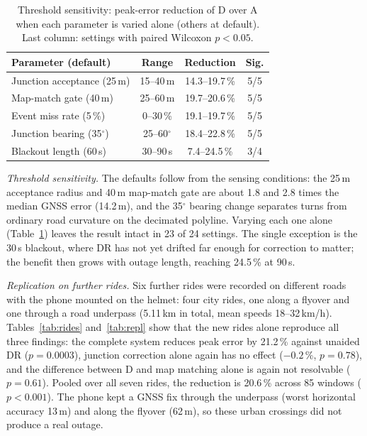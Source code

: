 \documentclass[conference]{IEEEtran}
\begin{document}
\begin{table}[t]
\centering
\caption{Threshold sensitivity: peak-error reduction of D over A when each parameter is varied alone (others at default). Last column: settings with paired Wilcoxon $p{<}0.05$.}
\label{tab:sweep}
\setlength{\tabcolsep}{3pt}
\begin{tabular}{@{}lccc@{}}
\toprule
\textbf{Parameter (default)} & \textbf{Range} & \textbf{Reduction} & \textbf{Sig.}\\
\midrule
Junction acceptance (25\,m) & 15--40\,m & 14.3--19.7\,\% & 5/5\\
Map-match gate (40\,m) & 25--60\,m & 19.7--20.6\,\% & 5/5\\
Event miss rate (5\,\%) & 0--30\,\% & 19.1--19.7\,\% & 5/5\\
Junction bearing (35$^\circ$) & 25--60$^\circ$ & 18.4--22.8\,\% & 5/5\\
Blackout length (60\,s) & 30--90\,s & 7.4--24.5\,\% & 3/4\\
\bottomrule
\end{tabular}
\end{table}

\emph{Threshold sensitivity.} The defaults follow from the sensing conditions: the 25\,m acceptance radius and 40\,m map-match gate are about 1.8 and 2.8 times the median GNSS error (14.2\,m), and the 35$^\circ$ bearing change separates turns from ordinary road curvature on the decimated polyline. Varying each one alone (Table~\ref{tab:sweep}) leaves the result intact in 23 of 24 settings. The single exception is the 30\,s blackout, where DR has not yet drifted far enough for correction to matter; the benefit then grows with outage length, reaching 24.5\,\% at 90\,s.

\emph{Replication on further rides.} Six further rides were recorded on different roads with the phone mounted on the helmet: four city rides, one along a flyover and one through a road underpass (5.11\,km in total, mean speeds 18--32\,km/h). Tables~\ref{tab:rides} and~\ref{tab:repl} show that the new rides alone reproduce all three findings: the complete system reduces peak error by 21.2\,\% against unaided DR ($p{=}0.0003$), junction correction alone again has no effect ($-0.2$\,\%, $p{=}0.78$), and the difference between D and map matching alone is again not resolvable ($p{=}0.61$). Pooled over all seven rides, the reduction is 20.6\,\% across 85 windows ($p{<}0.001$). The phone kept a GNSS fix through the underpass (worst horizontal accuracy 13\,m) and along the flyover (62\,m), so these urban crossings did not produce a real outage.
\end{document}
